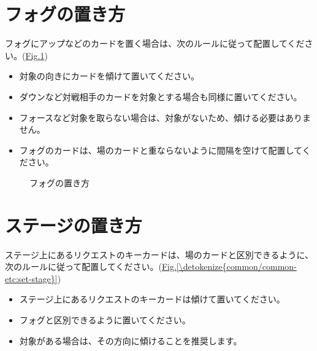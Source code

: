 \documentclass[letterpaper,10pt,dvipdfmx]{sphinxmanual}
\begin{document}
\section{フォグの置き方}
\label{\detokenize{common/common-etc:id7}}
\sphinxAtStartPar
フォグにアップなどのカードを置く場合は、次のルールに従って配置してください。(\hyperref[\detokenize{common/common-etc:set-fog}]{Fig.\@ \ref{\detokenize{common/common-etc:set-fog}}})
\begin{itemize}
\item {} 
\sphinxAtStartPar
対象の向きにカードを傾けて置いてください。

\item {} 
\sphinxAtStartPar
ダウンなど対戦相手のカードを対象とする場合も同様に置いてください。

\item {} 
\sphinxAtStartPar
フォースなど対象を取らない場合は、対象がないため、傾ける必要はありません。

\item {} 
\sphinxAtStartPar
フォグのカードは、場のカードと重ならないように間隔を空けて配置してください。

\end{itemize}

\begin{figure}[htbp]
\centering
\capstart

\noindent{}
\caption{フォグの置き方}\label{\detokenize{common/common-etc:id10}}\label{\detokenize{common/common-etc:set-fog}}\end{figure}


\section{ステージの置き方}
\label{\detokenize{common/common-etc:id8}}
\sphinxAtStartPar
ステージ上にあるリクエストのキーカードは、場のカードと区別できるように、次のルールに従って配置してください。(\hyperref[\detokenize{common/common-etc:set-stage}]{Fig.\@ \ref{\detokenize{common/common-etc:set-stage}}})
\begin{itemize}
\item {} 
\sphinxAtStartPar
ステージ上にあるリクエストのキーカードは傾けて置いてください。

\item {} 
\sphinxAtStartPar
フォグと区別できるように置いてください。

\item {} 
\sphinxAtStartPar
対象がある場合は、その方向に傾けることを推奨します。

\end{itemize}
\end{document}
